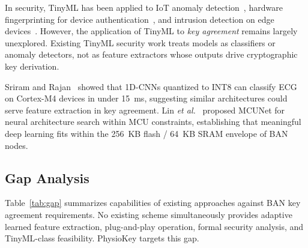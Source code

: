 \documentclass[sensors,article,submit,pdftex,moreauthors]{Definitions/mdpi}
\newcommand{\etal}{\textit{et al.}}
\begin{document}
In security, TinyML has been applied to IoT anomaly detection~\cite{antonini2023tiny}, hardware fingerprinting for device authentication~\cite{chatterjee2019rf}, and intrusion detection on edge devices~\cite{alhanahnah2023tinyml}. However, the application of TinyML to \textit{key agreement} remains largely unexplored. Existing TinyML security work treats models as classifiers or anomaly detectors, not as feature extractors whose outputs drive cryptographic key derivation.

Sriram and Rajan~\cite{sriram2022tinyml} showed that 1D-CNNs quantized to INT8 can classify ECG on Cortex-M4 devices in under 15~ms, suggesting similar architectures could serve feature extraction in key agreement. Lin \etal~\cite{lin2020mcunet} proposed MCUNet for neural architecture search within MCU constraints, establishing that meaningful deep learning fits within the 256~KB flash / 64~KB SRAM envelope of BAN nodes.

\subsection{Gap Analysis}
\label{subsec:gap}

Table~\ref{tab:gap} summarizes capabilities of existing approaches against BAN key agreement requirements. No existing scheme simultaneously provides adaptive learned feature extraction, plug-and-play operation, formal security analysis, and TinyML-class feasibility. PhysioKey targets this gap.
\end{document}
